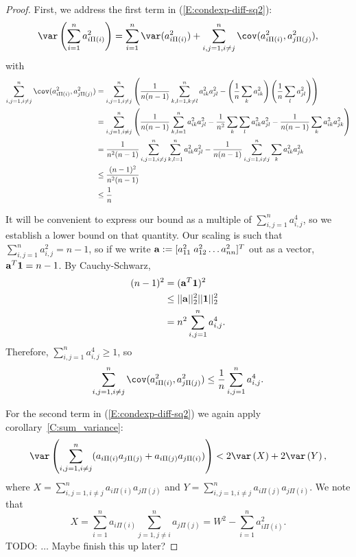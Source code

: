 \begin{theorem}
\begin{proof}
    First, we address the first term in (\ref{E:condexp-diff-sq2}):
    \begin{equation*}
        \var \left ( \sum_{i=1}^n a_{i \Pi(i)}^2 \right ) = \sum_{i=1}^n \var(a_{i \Pi(i)}^2) +
        \sum_{i,j=1, i\neq j}^n \cov(a_{i \Pi(i)}^2, a_{j \Pi(j)}^2),
    \end{equation*}
    with 
    \begin{align*}
      \sum_{i,j=1, i\neq j}^n \cov(a_{i \Pi(i)}^2, a_{j \Pi(j)}^2)
      &= \sum_{i,j=1, i\neq j}^n \left ( \frac{1}{n(n-1)} \sum_{k,l=1, k\neq l}^n a_{ik}^2 a_{jl}^2 -
      \left ( \frac{1}{n} \sum_k a_{ik}^2 \right ) \left ( \frac{1}{n} \sum_l a_{jl}^2 \right )
      \right ) \\
      &= \sum_{i,j=1, i\neq j}^n \left ( \frac{1}{n(n-1)} \sum_{k,l=1}^n a_{ik}^2 a_{jl}^2
        - \frac{1}{n^2} \sum_k \sum_l a_{ik}^2 a_{jl}^2
        - \frac{1}{n(n-1)} \sum_k a_{ik}^2 a_{jk}^2 \right ) \\
      &= \frac{1}{n^2(n-1)} \sum_{i,j=1, i\neq j}^n \sum_{k,l=1}^n a_{ik}^2 a_{jl}^2
      - \frac{1}{n(n-1)} \sum_{i,j=1, i\neq j}^n \sum_k a_{ik}^2 a_{jk}^2 \\
      &\leq \frac{(n-1)^2}{n^2(n-1)} \\
      &\leq \frac{1}{n}
    \end{align*}
    
    It will be convenient to express our bound as a multiple of $\sum_{i,j=1}^n a_{i,j}^4$, so we
    establish a lower bound on that quantity.  Our scaling is such that $\sum_{i,j=1}^n a_{i,j}^2 =
    n-1$, so if we write ${\bf a} := [a_{11}^2 \; a_{12}^2 \ldots a_{nn}^2]^T$ out as a vector,
    ${\bf a}^T{\bf 1} = n-1$.  By Cauchy-Schwarz, 
    \begin{align*}
      (n - 1)^2 &= ({\bf a}^T{\bf 1})^2 \\
      &\leq ||{\bf a}||_2^2 ||{\bf 1}||_2^2 \\
      &= n^2 \sum_{i,j=1}^n a_{i,j}^4.
    \end{align*}
    Therefore, $\sum_{i,j=1}^n a_{i,j}^4 \geq 1$, so 
    \begin{equation}
      \sum_{i,j=1, i\neq j}^n \cov(a_{i \Pi(i)}^2, a_{j \Pi(j)}^2) \leq \frac{1}{n} \sum_{i,j=1}^n a_{i,j}^4.
    \end{equation}

    For the second term in (\ref{E:condexp-diff-sq2}) we again apply corollary~\ref{C:sum_variance}:
    \begin{equation*}
      \var \left ( \sum_{i,j=1, i\neq j}^n (a_{i\Pi(i)}a_{j\Pi(j)} + a_{i\Pi(j)}a_{j\Pi(i)}) \right )
      < 2 \var \left ( X \right ) + 
      2 \var \left ( Y \right ),
    \end{equation*}
    where $X = \sum_{i,j=1, i\neq j}^n a_{i\Pi(i)}a_{j\Pi(j)}$ and $Y = \sum_{i,j=1, i\neq j}^n
    a_{i\Pi(j)}a_{j\Pi(i)}$.
    We note that 
    \begin{equation}
      X = \sum_{i=1}^n a_{i\Pi(i)} \sum_{j=1, j\neq i}^n a_{j\Pi(j)} = W^2 - \sum_{i=1}^n a_{i\Pi(i)}^2.
    \end{equation}
    TODO: $\ldots$ Maybe finish this up later?  
  \end{proof}
\end{theorem}

